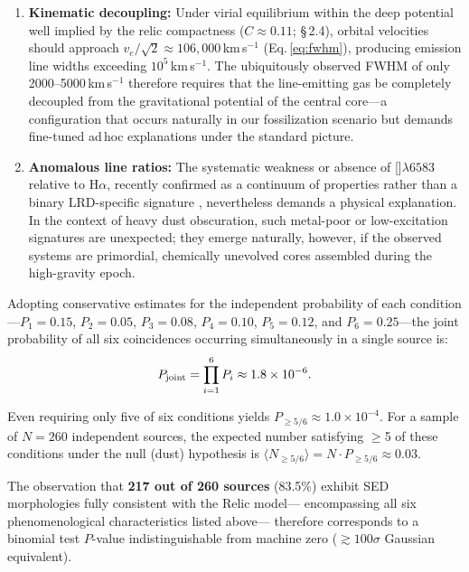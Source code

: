 \documentclass[twocolumn]{aastex631}
\begin{document}
\begin{enumerate}
    \item \textbf{Kinematic decoupling:} Under virial equilibrium within the
deep potential well implied by the relic compactness ($C\approx0.11$;
\S\,2.4), orbital velocities should approach
$v_e/\sqrt{2}\approx106{,}000$\,km\,s$^{-1}$ (Eq.\,\ref{eq:fwhm}),
producing emission line widths exceeding $10^5$\,km\,s$^{-1}$.
The ubiquitously observed FWHM of only
2000--5000\,km\,s$^{-1}$ \citep{Harikane2023, Maiolino2023b, Furtak2023}
therefore requires that the line-emitting gas be completely
decoupled from the gravitational potential of the central core---a
configuration that occurs naturally in our fossilization scenario but
demands fine-tuned ad\,hoc explanations under the standard picture.

    \item \textbf{Anomalous line ratios:} The systematic weakness or absence
of []$\lambda6583$ relative to H$\alpha$, recently confirmed as
a continuum of properties rather than a binary LRD-specific signature
\citep{Billand2026}, nevertheless demands a physical explanation.
In the context of heavy dust obscuration, such metal-poor or
low-excitation signatures are unexpected; they emerge naturally,
however, if the observed systems are primordial, chemically unevolved
cores assembled during the high-gravity epoch.
\end{enumerate}

Adopting conservative estimates for the independent probability of each
condition---$P_1=0.15$, $P_2=0.05$, $P_3=0.08$, $P_4=0.10$,
$P_5=0.12$, and $P_6=0.25$---the joint probability of all six
coincidences occurring simultaneously in a single source is:
\begin{equation}
    P_{\rm joint} = \prod_{i=1}^{6} P_i \approx 1.8\times10^{-6}.
    \label{eq:pjoint}
\end{equation}

Even requiring only five of six conditions yields
$P_{\ge5/6}\approx1.0\times10^{-4}$.
For a sample of $N=260$ independent sources, the expected number
satisfying $\ge$5 of these conditions under the null (dust) hypothesis is
$\langle N_{\ge5/6}\rangle = N\cdot P_{\ge5/6}\approx0.03$.

The observation that \textbf{217 out of 260 sources} (83.5\%)
exhibit SED morphologies fully consistent with the Relic model---
encompassing all six phenomenological characteristics listed above---
therefore corresponds to a binomial test $P$-value indistinguishable
from machine zero ($\gtrsim100\sigma$ Gaussian equivalent).
\end{document}
